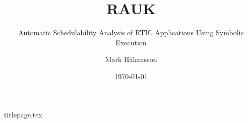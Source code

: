 \documentclass[10pt]{beamer}
\title[Thesis Presentation]{RAUK}
\subtitle{Automatic Schedulability Analysis of RTIC Applications Using Symbolic Execution}
\author{Mark Håkansson}
\institute{
    Supervisor: Prof. Per Lindgren \\
    Luleå University of Technology}
\date{\today}
\begin{document}
{titlepage.tex}
\end{document}
